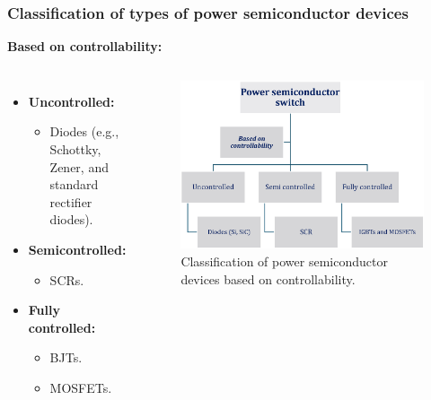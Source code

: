 \begin{frame}
	\frametitle{Classification of types of power semiconductor devices}
    \textbf{Based on controllability:}
    \begin{columns}
        \begin{itemize}
            \item \textbf{Uncontrolled:}
            \begin{itemize}
                \item Diodes (e.g., Schottky, Zener, and standard rectifier diodes).
            \end{itemize}
            \item \textbf{Semicontrolled:}
            \begin{itemize}
                \item SCRs.
            \end{itemize}
            \item \textbf{Fully controlled:}
            \begin{itemize}
                \item BJTs.
                \item MOSFETs.
            \end{itemize}
        \end{itemize}

        \begin{figure}
            \centering
            \label{fig:Classification_based_on_controllability}
            \includegraphics[scale=0.35]{fig/lec04/classification_of_device_3.eps}
            \caption{Classification of power semiconductor devices based on controllability.}
        \end{figure}
    \end{columns}
\end{frame}


